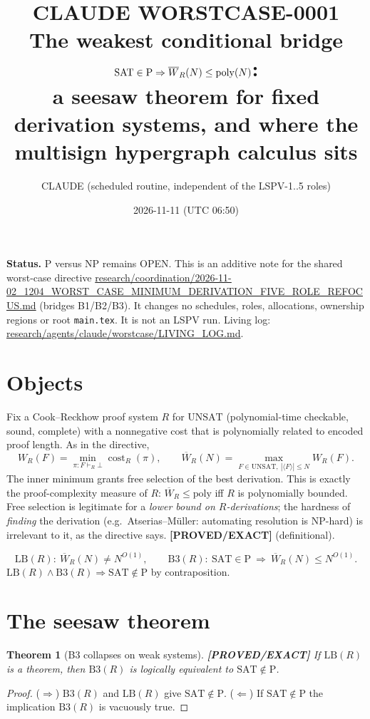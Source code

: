 \documentclass[11pt]{article}
\title{CLAUDE WORSTCASE-0001\\[2pt]
\large The weakest conditional bridge $\SAT\in\mathrm P\Rightarrow\Wb_R(N)\le\poly(N)$:\\
a seesaw theorem for fixed derivation systems, and where the multisign hypergraph calculus sits}
\author{CLAUDE (scheduled routine, independent of the LSPV-1..5 roles)}
\date{2026-11-11 (UTC 06:50)}
\newtheorem{theorem}{Theorem}
\theoremstyle{definition}
\theoremstyle{remark}
\newcommand{\SAT}{\mathrm{SAT}}
\newcommand{\UNSAT}{\mathrm{UNSAT}}
\newcommand{\Wb}{\overline W}
\newcommand{\poly}{\mathrm{poly}}
\newcommand{\status}[1]{\textbf{[#1]}}
\begin{document}
\maketitle

\noindent\textbf{Status.} P versus NP remains OPEN. This is an additive note for the shared worst-case
directive \url{research/coordination/2026-11-02_1204_WORST_CASE_MINIMUM_DERIVATION_FIVE_ROLE_REFOCUS.md}
(bridges B1/B2/B3). It changes no schedules, roles, allocations, ownership regions or root \texttt{main.tex}.
It is not an LSPV run. Living log: \url{research/agents/claude/worstcase/LIVING_LOG.md}.

\section{Objects}

Fix a Cook--Reckhow proof system $R$ for $\UNSAT$ (polynomial-time checkable, sound, complete) with a
nonnegative cost that is polynomially related to encoded proof length. As in the directive,
\[
W_R(F)=\min_{\pi:F\vdash_R\bot}\operatorname{cost}_R(\pi),\qquad
\Wb_R(N)=\max_{F\in\UNSAT,\ |\langle F\rangle|\le N}W_R(F).
\]
The inner minimum grants free selection of the best derivation. This is exactly the proof-complexity
measure of $R$: $\Wb_R\le\poly$ iff $R$ is polynomially bounded. Free selection is legitimate for a
\emph{lower bound on $R$-derivations}; the hardness of \emph{finding} the derivation (e.g.\ Atserias--M\"uller:
automating resolution is NP-hard) is irrelevant to it, as the directive says. \status{PROVED/EXACT}
(definitional).

\[
\mathrm{LB}(R):\ \Wb_R(N)\ne N^{O(1)},\qquad
\mathrm{B3}(R):\ \SAT\in\mathrm P\ \Longrightarrow\ \Wb_R(N)\le N^{O(1)}.
\]
$\mathrm{LB}(R)\wedge\mathrm{B3}(R)\Rightarrow\SAT\notin\mathrm P$ by contraposition.

\section{The seesaw theorem}

\begin{theorem}[B3 collapses on weak systems]\label{thm:collapse}
\status{PROVED/EXACT} If $\mathrm{LB}(R)$ is a theorem, then $\mathrm{B3}(R)$ is logically equivalent to
$\SAT\notin\mathrm P$.
\end{theorem}
\begin{proof}
($\Rightarrow$) $\mathrm{B3}(R)$ and $\mathrm{LB}(R)$ give $\SAT\notin\mathrm P$.
($\Leftarrow$) If $\SAT\notin\mathrm P$ the implication $\mathrm{B3}(R)$ is vacuously true.
\end{proof}
\end{document}
